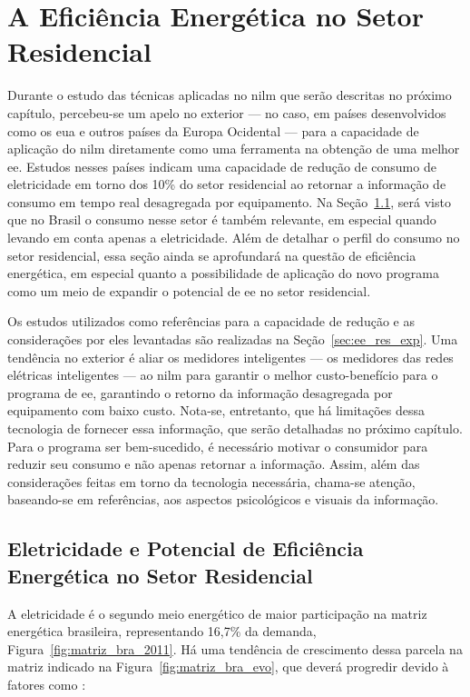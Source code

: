 \chapter{A Eficiência Energética no Setor Residencial}
\label{chap:ee_retorno}

Durante o estudo das técnicas aplicadas no \acs{nilm} que serão
descritas no próximo capítulo, percebeu-se um apelo no exterior --- no
caso, em países desenvolvidos como os \acs{eua} e outros países da
Europa Ocidental --- para a capacidade de aplicação do \acs{nilm}
diretamente como uma ferramenta na obtenção de uma melhor \acs{ee}.
Estudos nesses países indicam uma capacidade de redução de consumo de eletricidade
em torno dos 10\% do setor residencial ao retornar a informação de
consumo em tempo real desagregada por equipamento. Na
Seção~\ref{sec:ee_setor_residencial}, será visto que no Brasil o
consumo nesse setor é também relevante, em especial quando levando em
conta apenas a eletricidade. Além de detalhar o perfil do consumo no
setor residencial, essa seção ainda se aprofundará na questão de
eficiência energética, em especial quanto a possibilidade de aplicação
do novo programa como um meio de expandir o potencial de \acs{ee} no
setor residencial.

Os estudos utilizados como referências para a capacidade de redução e
as considerações por eles levantadas são realizadas na
Seção~\ref{sec:ee_res_exp}. Uma tendência no exterior é aliar os
medidores inteligentes --- os medidores das redes elétricas
inteligentes --- ao \acs{nilm} para garantir o melhor
custo-benefício para o programa de \acs{ee}, garantindo o retorno da
informação desagregada por equipamento com baixo custo. Nota-se,
entretanto, que há limitações dessa tecnologia de fornecer essa
informação, que serão detalhadas no próximo capítulo. Para o programa
ser bem-sucedido, é necessário motivar o consumidor para reduzir seu
consumo e não apenas retornar a informação. Assim, além das
considerações feitas em torno da tecnologia necessária, chama-se
atenção, baseando-se em referências, aos aspectos psicológicos e
visuais da informação.

\section{Eletricidade e Potencial de Eficiência Energética 
no Setor Residencial}
\label{sec:ee_setor_residencial}

A eletricidade é o segundo meio energético de maior participação na matriz 
energética brasileira, representando 16,7\% da demanda, 
Figura~\ref{fig:matriz_bra_2011}. 
Há uma tendência de crescimento dessa parcela na matriz indicado na 
Figura~\ref{fig:matriz_bra_evo}, que deverá progredir devido à fatores 
como \cite{iea_weo2010}:

